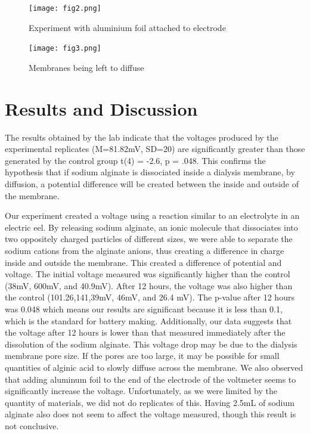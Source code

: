 \documentclass[letterpaper]{article}
\begin{document}

\begin{figure}
	\centering
	\texttt{[image: fig2.png]}
	\caption{Experiment with aluminium foil attached to electrode}
	\label{fig:2}
\end{figure}

\begin{figure}
	\centering
	\texttt{[image: fig3.png]}
	\caption{Membranes being left to diffuse}
	\label{fig:3}
\end{figure}

\section{Results and Discussion}
\label{sec:results and Discussion}

The results obtained by the lab indicate that the voltages produced by the experimental 
replicates (M=81.82mV, SD=20) are significantly greater than those generated by the control 
group t(4) = -2.6, p = .048. This confirms the hypothesis that if sodium alginate is 
dissociated inside a dialysis membrane, by diffusion, a potential difference will be 
created between the inside and outside of the membrane.

Our experiment created a voltage using a reaction similar to an electrolyte in an 
electric eel. By releasing sodium alginate, an ionic molecule that dissociates into 
two oppositely charged particles of different sizes, we were able to separate the 
sodium cations from the alginate anions, thus creating a difference in charge inside 
and outside the membrane. This created a difference of potential and voltage. The initial 
voltage measured was significantly higher than the control (38mV, 600mV, and 40.9mV). 
After 12 hours, the voltage was also higher than the control (101.26,141,39mV, 46mV, and 26.4 mV). 
The p-value after 12 hours was 0.048 which means our results are significant because 
it is less than 0.1, which is the standard for battery making\parencite{niriQuantifyingKeyFactors2022}. 
Additionally, our data suggests that the voltage after 12 hours is lower than that measured immediately after the dissolution of the sodium alginate. This voltage drop may be due to the dialysis membrane pore size. If the pores are too large, it may be possible for small quantities of alginic acid to slowly diffuse across the membrane. We also observed that adding aluminum foil to the end of the electrode of the voltmeter seems to significantly increase the voltage. Unfortunately, as we were limited by the quantity of materials, we did not do replicates of this. Having 2.5mL of sodium alginate also does not seem to affect the voltage measured, though this result is not conclusive.
\end{document}
